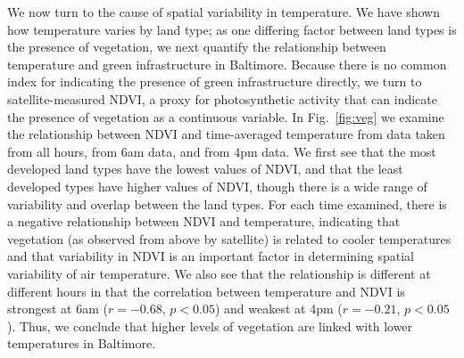 We now turn to the cause of spatial variability in temperature. We have shown how temperature varies by land type; as one differing factor between land types is the presence of vegetation, we next quantify the relationship between temperature and green infrastructure in Baltimore. 
Because there is no common index for indicating the presence of green infrastructure directly, we turn to satellite-measured NDVI, a proxy for photosynthetic activity that can indicate the presence of vegetation as a continuous variable. 
In Fig.~\ref{fig:veg} we examine the relationship between NDVI and time-averaged temperature from data taken from all hours, from 6am data, and from 4pm data. We first see that the most developed land types have the lowest values of NDVI, and that the least developed types have higher values of NDVI, though there is a wide range of variability and overlap between the land types. For each time examined, there is a negative relationship between NDVI and temperature, indicating that vegetation (as observed from above by satellite) is related to cooler temperatures and  that variability in NDVI is an important factor in determining spatial variability of air temperature. We also see that the relationship is different at different hours in that the correlation between temperature and NDVI is strongest at 6am ($r = -0.68$, $p< 0.05$) and weakest at 4pm ($r= -0.21$, $p<0.05$). Thus, we conclude that higher levels of vegetation are linked with lower temperatures in Baltimore. 

